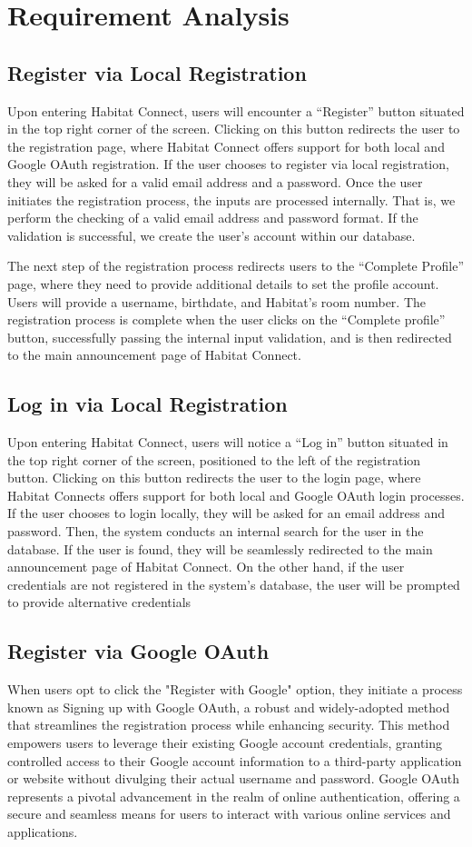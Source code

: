 \documentclass[conference]{IEEEtran}
\begin{document}
\section{Requirement Analysis}
\subsection{Register via Local Registration}
Upon entering Habitat Connect, users will encounter a “Register” button situated in the top right corner of the screen. Clicking on this button redirects the user to the registration page, where Habitat Connect offers support for both local and Google OAuth registration. If the user chooses to register via local registration, they will be asked for a valid email address and a password. Once the user initiates the registration process, the inputs are processed internally. That is, we perform the checking of a valid email address and password format. If the validation is successful, we create the user’s account within our database.

The next step of the registration process redirects users to the “Complete Profile” page, where they need to provide additional details to set the profile account. Users will provide a username, birthdate, and Habitat’s room number. The registration process is complete when the user clicks on the “Complete profile” button, successfully passing the internal input validation, and is then redirected to the main announcement page of Habitat Connect.
\subsection{Log in via Local Registration}
Upon entering Habitat Connect, users will notice a “Log in” button situated in the top right corner of the screen, positioned to the left of the registration button. Clicking on this button redirects the user to the login page, where Habitat Connects offers support for both local and Google OAuth login processes. If the user chooses to login locally, they will be asked for an email address and password. Then, the system conducts an internal search for the user in the database. If the user is found, they will be seamlessly redirected to the main announcement page of Habitat Connect. On the other hand, if the user credentials are not registered in the system’s database, the user will be prompted to provide alternative credentials
\subsection{Register via Google OAuth}
When users opt to click the "Register with Google" option, they initiate a process known as Signing up with Google OAuth, a robust and widely-adopted method that streamlines the registration process while enhancing security. This method empowers users to leverage their existing Google account credentials, granting controlled access to their Google account information to a third-party application or website without divulging their actual username and password. Google OAuth represents a pivotal advancement in the realm of online authentication, offering a secure and seamless means for users to interact with various online services and applications.
\end{document}
